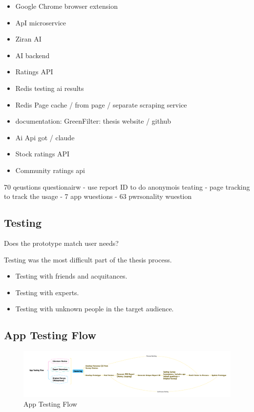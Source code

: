\documentclass[
  letterpaper,
  DIV=11,
  numbers=noendperiod]{scrartcl}
\begin{document}
\begin{itemize}
\item
  Google Chrome browser extension
\item
  ApI microservice
\item
  Ziran AI
\item
  AI backend
\item
  Ratings API
\item
  Redis testing ai results
\item
  Redis Page cache / from page / separate scraping service
\item
  documentation: GreenFilter: thesis website / github
\item
  Ai Api got / claude
\item
  Stock ratings API
\item
  Community ratings api
\end{itemize}

70 qeustions questionairw - use report ID to do anonymois teating - page
tracking to track the usage - 7 app wuestions - 63 pwrsonality wuestion

\newpage

\subsection{Testing}\label{testing-1}

Does the prototype match user needs?

Testing was the most difficult part of the thesis process.

\begin{itemize}
\item
  Testing with friends and acquitances.
\item
  Testing with experts.
\item
  Testing with unknown people in the target audience.
\end{itemize}

\subsection{App Testing Flow}\label{app-testing-flow}

\begin{figure}[H]

{\centering \includegraphics[width=1\linewidth,height=\textheight,keepaspectratio]{./images/testing/app-testing-flow.png}

}

\caption{App Testing Flow}

\end{figure}%
\end{document}
